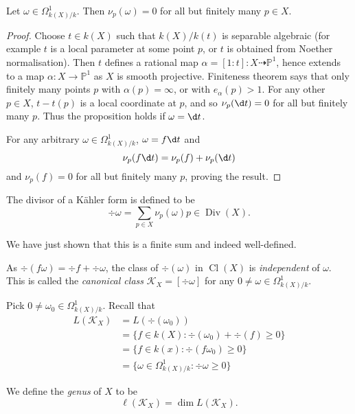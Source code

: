 \documentclass[a4paper]{article}
\DeclareMathOperator{\Cl}{Cl}
\renewcommand*{\P}{\mathbb{P}}
\newcommand{\rational}{\dashrightarrow} %
\DeclareMathOperator{\Div}{Div} %
\begin{document}
\begin{proposition}
  Let \(\omega \in \Omega^1_{k(X)/k}\). Then \(\nu_p(\omega) = 0\) for all but finitely many \(p \in X\).
\end{proposition}

\begin{proof}
  Choose \(t \in k(X)\) such that \(k(X)/k(t)\) is separable algebraic (for example \(t\) is a local parameter at some point \(p\), or \(t\) is obtained from Noether normalisation). Then \(t\) defines a rational map \(\alpha = [1: t]: X \rational \P^1\), hence extends to a map \(\alpha: X \to \P^1\) as \(X\) is smooth projective. Finiteness theorem says that only finitely many points \(p\) with \(\alpha(p) = \infty\), or with \(e_\alpha(p) > 1\). For any other \(p \in X\), \(t - t(p)\) is a local coordinate at \(p\), and so \(\nu_p(\d t) = 0\) for all but finitely many \(p\). Thus the proposition holds if \(\omega = \d t\).

  For any arbitrary \(\omega \in \Omega^1_{k(X)/k}\), \(\omega = f \d t\) and
  \[
    \nu_p(f \d t) = \nu_p(f) + \nu_p(\d t)
  \]
  and \(\nu_p(f) = 0\) for all but finitely many \(p\), proving the result.
\end{proof}

\begin{definition}
  The divisor of a Kähler form is defined to be
  \[
    \div \omega = \sum_{p \in X} \nu_p(\omega) p \in \Div(X).
  \]
\end{definition}
We have just shown that this is a finite sum and indeed well-defined.

As \(\div (f\omega) = \div f + \div \omega\), the class of \(\div(\omega)\) in \(\Cl(X)\) is \emph{independent} of \(\omega\). This is called the \emph{canonical class} \(\mathcal K_X = [\div \omega]\) for any \(0 \neq \omega \in \Omega^1_{k(X)/k}\).

Pick \(0 \neq \omega_0 \in \Omega^1_{k(X)/k}\). Recall that
\begin{align*}
  L(\mathcal K_X)
  &= L(\div(\omega_0)) \\
  &= \{f \in k(X): \div(\omega_0) + \div (f) \geq 0\} \\
  &= \{f \in k(x): \div (f \omega_0) \geq 0\} \\
  &= \{\omega \in \Omega^1_{k(X)/k}: \div \omega \geq 0\}
\end{align*}

\begin{definition}[genus]
  We define the \emph{genus} of \(X\) to be
  \[
    \ell(\mathcal K_X) = \dim L(\mathcal K_X).
  \]
\end{definition}
\end{document}
